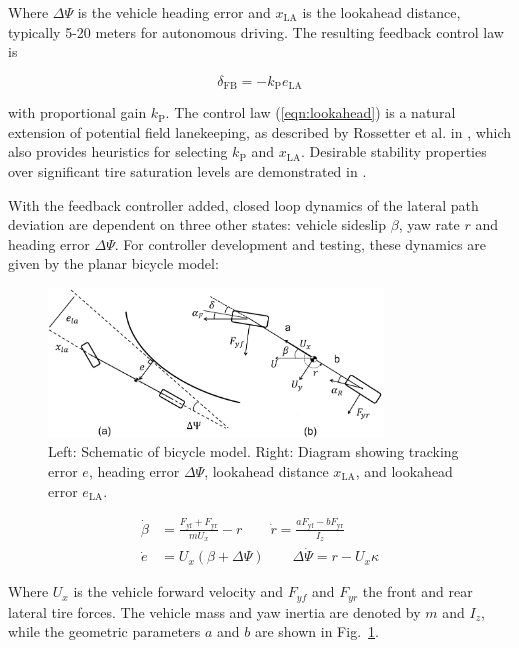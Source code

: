 \documentclass[letterpaper, 10 pt, conference]{ieeeconf}  %
\begin{document}
Where $\Delta\Psi$ is the vehicle heading error and $x_\mathrm{LA}$ is the lookahead distance, typically 5-20 meters for autonomous driving.  The resulting feedback control law is

\begin{equation}
	\delta_\mathrm{FB} = -k_\mathrm{P}e_\mathrm{LA}
	\label{eqn:lookahead}
\end{equation}

with proportional gain $k_\mathrm{P}$. The control law (\ref{eqn:lookahead}) is a natural extension of potential field lanekeeping, as described by Rossetter et al. in \cite{rossetter2002}, which also provides heuristics for 
selecting $k_\mathrm{P}$ and $x_\mathrm{LA}$. Desirable stability properties over significant tire saturation levels are demonstrated in \cite{talvala}.

With the feedback controller added, closed loop dynamics of the lateral path deviation are dependent on three other states: vehicle sideslip $\beta$, yaw rate $r$ and heading error $\Delta\Psi$. For controller development
and testing, these dynamics are given by the planar bicycle model:

\begin{figure}
\centering
\includegraphics[width=3.5in]{figures/BikeModelSchematic.png}
\caption{Left: Schematic of bicycle model. Right: Diagram showing tracking error $e$, heading error $\Delta\Psi$, lookahead distance $x_\mathrm{LA}$, and lookahead error $e_\mathrm{LA}$.}
\label{fig:bikemodel}
\end{figure}

\begin{subequations}
\label{eq:bm}
\begin{align}
	\dot{\beta} &= \frac{F_\mathrm{yf}+F_\mathrm{yr}}{mU_x} - r \qquad \dot{r} = \frac{aF_\mathrm{yf} - bF_\mathrm{yr}}{I_z} \label{bm1} \\
	\dot{e} &= U_x (\beta + \Delta\Psi) \qquad \Delta\dot{\Psi} = r - U_x\kappa \label{eq:bm2} 
\end{align}
\end{subequations}

Where $U_x$ is the vehicle forward velocity and $F_{yf}$ and $F_{yr}$ the front and rear lateral tire forces. The vehicle mass and yaw inertia are denoted by $m$ and $I_z$, while the geometric
parameters $a$ and $b$ are shown in Fig.~\ref{fig:bikemodel}.
\end{document}
